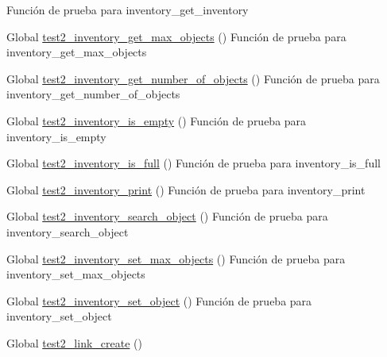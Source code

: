 \begin{DoxyRefList}
%
Función de prueba para inventory\+\_\+get\+\_\+inventory  
\item[Global \mbox{\hyperlink{inventory__test_8c_ac75954611acab583f780145532ab3197}{test2\+\_\+inventory\+\_\+get\+\_\+max\+\_\+objects}} ()]\label{test__test000076}%
%
Función de prueba para inventory\+\_\+get\+\_\+max\+\_\+objects  
\item[Global \mbox{\hyperlink{inventory__test_8c_afb66a921e4bd9b8df05b0c2fcbbc9649}{test2\+\_\+inventory\+\_\+get\+\_\+number\+\_\+of\+\_\+objects}} ()]\label{test__test000050}%
%
Función de prueba para inventory\+\_\+get\+\_\+number\+\_\+of\+\_\+objects  
\item[Global \mbox{\hyperlink{inventory__test_8c_a4d2a2a4d4ba59446d013debfe9bf05dc}{test2\+\_\+inventory\+\_\+is\+\_\+empty}} ()]\label{test__test000062}%
%
Función de prueba para inventory\+\_\+is\+\_\+empty  
\item[Global \mbox{\hyperlink{inventory__test_8c_a1c9e567d4919d5aaccc9580815a8a81d}{test2\+\_\+inventory\+\_\+is\+\_\+full}} ()]\label{test__test000065}%
%
Función de prueba para inventory\+\_\+is\+\_\+full  
\item[Global \mbox{\hyperlink{inventory__test_8c_ab416dcaf2ae0f9852a8c6ed5eea4f408}{test2\+\_\+inventory\+\_\+print}} ()]\label{test__test000054}%
%
Función de prueba para inventory\+\_\+print  
\item[Global \mbox{\hyperlink{inventory__test_8c_a1aeb71b051c56adb23f374997b3a7662}{test2\+\_\+inventory\+\_\+search\+\_\+object}} ()]\label{test__test000068}%
%
Función de prueba para inventory\+\_\+search\+\_\+object  
\item[Global \mbox{\hyperlink{inventory__test_8c_aff93a7fb7ffbac1890ce563012a9d372}{test2\+\_\+inventory\+\_\+set\+\_\+max\+\_\+objects}} ()]\label{test__test000073}%
%
Función de prueba para inventory\+\_\+set\+\_\+max\+\_\+objects  
\item[Global \mbox{\hyperlink{inventory__test_8c_ac6a46ad895e30089d52ed81d2f7d32c4}{test2\+\_\+inventory\+\_\+set\+\_\+object}} ()]\label{test__test000045}%
%
Función de prueba para inventory\+\_\+set\+\_\+object  
\item[Global \mbox{\hyperlink{link__test_8c_a24b5463da176c3e578b0a0fa8bb1f9f0}{test2\+\_\+link\+\_\+create}} ()]\label{test__test000078}%

\end{DoxyRefList}
